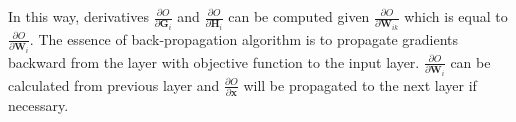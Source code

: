 \documentclass{article}
\begin{document}

In this way, derivatives $\frac{\partial O}{\partial \mathbf{G}_i}$ and $\frac{\partial O}{\partial \mathbf{H}_i}$ can be computed given $\frac{\partial O}{\partial \mathbf{W}_{ik}}$ which is equal to $\frac{\partial O}{\partial \mathbf{W}_i}$. The essence of back-propagation algorithm is to propagate gradients backward from the layer with objective function to the input layer. $\frac{\partial O}{\partial \mathbf{W}_i}$ can be calculated from previous layer and $\frac{\partial O}{\partial \mathbf{x}}$ will be propagated to the next layer if necessary.
\end{document}
